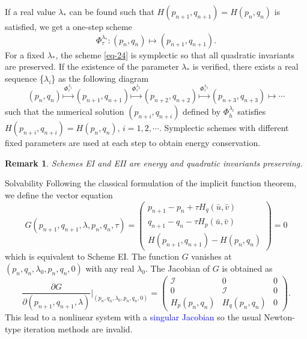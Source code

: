 \documentclass[10pt]{beamer}
\newtheorem{remark}{Remark}
\begin{document}
\begin{frame}
If a real value $\lambda_*$ can be found such that $H(p_{n+1},q_{n+1}) = H(p_n,q_n)$ is satisfied, we get a one-step scheme
\begin{equation}\label{eq-24}
\Phi_\tau^{\lambda_*}: (p_n,q_n) \mapsto (p_{n+1},q_{n+1}).
\end{equation} 
For a fixed $\lambda_*$, the scheme \eqref{eq-24} is symplectic so that all quadratic invariants are preserved. If the existence of the parameter $\lambda_*$ is verified, there exists a real sequence \{$\lambda_i$\} as the following diagram
\begin{equation}\label{eq-25}
(p_n,q_n) \stackrel{\Phi_\tau^{\lambda_1}}{\longmapsto} (p_{n+1},q_{n+1}) \stackrel{\Phi_\tau^{\lambda_2}}{\longmapsto} (p_{n+2},q_{n+2}) \stackrel{\Phi_\tau^{\lambda_3}}{\longmapsto} (p_{n+3},q_{n+3}) \longmapsto \cdots
\end{equation}
such that the numerical solution $(p_{n+i},q_{n+i})$ defined by $\Phi_h^{\lambda_i}$ satisfies $H(p_{n+i},q_{n+i})=H(p_n,q_n)$, $i=1,2,\cdots$. Symplectic schemes with different fixed parameters are used at each step to obtain energy conservation. 

\begin{remark}
Schemes EI and EII are energy and quadratic invariants preserving.
\end{remark}
\end{frame}

\begin{frame}{Solvability}
Following the classical formulation of the implicit function theorem, we define the vector equation
\begin{equation}\label{eq-26}
G(p_{n+1},q_{n+1},\lambda,p_n,q_n,\tau)=
\left(
\begin{array}{c}
p_{n+1}-p_n+\tau H_q(\bar{u},\bar{v})\\
q_{n+1}-q_n-\tau H_p(\bar{u},\bar{v})\\
H(p_{n+1},q_{n+1})-H(p_n,q_n)
\end{array}\right)=0
\end{equation}
which is equivalent to Scheme EI. The function $G$ vanishes at $(p_n,q_n,\lambda_0,p_n,q_n,0)$ with any real $\lambda_0$. The Jacobian of $G$ is obtained as
\begin{equation}\label{eq-27}
\frac{\partial G}{\partial(p_{n+1},q_{n+1},\lambda)}\bigg|_{(p_n,q_n,\lambda_0,p_n,q_n,0)} =
\left ( \begin{array}{ccc}
\mathcal{I} & 0 & 0\\
0 & \mathcal{I} & 0\\
H_p(p_n,q_n) & H_q(p_n,q_n) & 0
\end{array}\right).
\end{equation}
This lead to a nonlinear system with a \textcolor{blue}{singular Jacobian} so the usual Newton-type iteration methods are invalid.
\end{frame}
\end{document}
